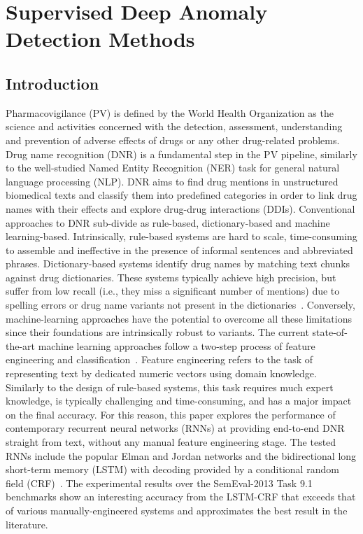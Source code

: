\chapter{Supervised Deep Anomaly Detection Methods}
\label{chpt:supervisedDAD}
\section{Introduction}
Pharmacovigilance (PV) is defined by the World Health Organization as the science and activities concerned with the detection, assessment, understanding and prevention of adverse effects of drugs or any other drug-related problems. Drug name recognition (DNR) is a fundamental step in the PV pipeline, similarly to  the well-studied Named Entity Recognition (NER) task for general natural language processing (NLP). DNR aims to find drug mentions in unstructured biomedical texts and classify them into predefined categories in order to link drug names with their effects and explore drug-drug interactions (DDIs). Conventional  approaches to DNR sub-divide as rule-based, dictionary-based and machine learning-based. Intrinsically, rule-based systems are hard to scale, time-consuming to assemble and ineffective in the presence of informal sentences and abbreviated phrases. Dictionary-based systems identify drug names by matching text chunks against drug dictionaries. These systems typically achieve high precision, but suffer from low recall (i.e., they miss a significant number of mentions) due to spelling errors or drug name variants not present in the dictionaries~\cite{liu2015drug}. Conversely, machine-learning approaches have the potential to overcome all these limitations since their foundations are intrinsically robust to variants. The current state-of-the-art machine learning approaches follow a two-step process of feature engineering and classification~\cite{segura2015exploring,abacha2015text,huber2013wbi}. Feature engineering refers to the task of representing text by dedicated numeric vectors using domain knowledge. Similarly to the design of rule-based systems, this task requires much expert knowledge, is typically challenging and time-consuming, and has a major impact on the final accuracy. For this reason, this paper explores the performance of contemporary recurrent neural networks (RNNs) at providing end-to-end DNR straight from text, without any manual feature engineering stage. The tested RNNs include the popular Elman and Jordan networks and the bidirectional long short-term memory (LSTM) with decoding provided by a conditional random field (CRF)~\cite{elman1990finding,jordan1986serial,lample2016neural,collobert2011natural}. The experimental results over the SemEval-2013 Task 9.1 benchmarks show an interesting accuracy from the LSTM-CRF that exceeds that of various manually-engineered systems and approximates the best result in the literature.
